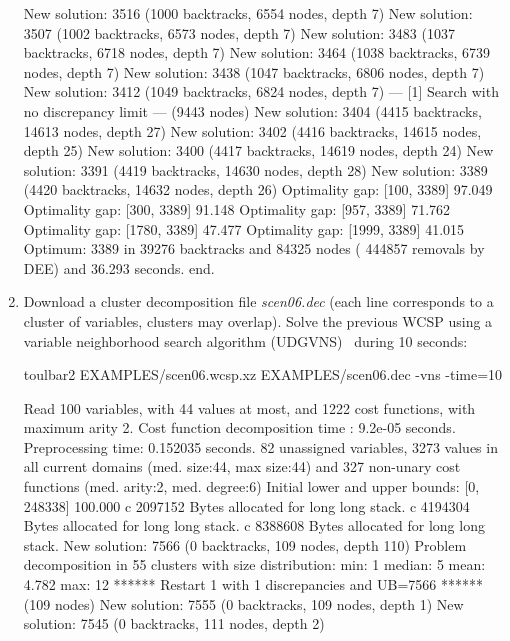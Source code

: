 \begin{enumerate}
{\begin{DoxyCode}
New solution: 3516 (1000 backtracks, 6554 nodes, depth 7)
New solution: 3507 (1002 backtracks, 6573 nodes, depth 7)
New solution: 3483 (1037 backtracks, 6718 nodes, depth 7)
New solution: 3464 (1038 backtracks, 6739 nodes, depth 7)
New solution: 3438 (1047 backtracks, 6806 nodes, depth 7)
New solution: 3412 (1049 backtracks, 6824 nodes, depth 7)
--- [1] Search with no discrepancy limit --- (9443 nodes)
New solution: 3404 (4415 backtracks, 14613 nodes, depth 27)
New solution: 3402 (4416 backtracks, 14615 nodes, depth 25)
New solution: 3400 (4417 backtracks, 14619 nodes, depth 24)
New solution: 3391 (4419 backtracks, 14630 nodes, depth 28)
New solution: 3389 (4420 backtracks, 14632 nodes, depth 26)
Optimality gap: [100, 3389] 97.049 %
Optimality gap: [300, 3389] 91.148 %
Optimality gap: [957, 3389] 71.762 %
Optimality gap: [1780, 3389] 47.477 %
Optimality gap: [1999, 3389] 41.015 %
Optimum: 3389 in 39276 backtracks and 84325 nodes ( 444857 removals by DEE) and 36.293 seconds.
end.
\end{DoxyCode}}
\item Download a cluster decomposition file {\em scen06.dec} (each line corresponds to a cluster of variables, clusters may overlap). Solve the previous WCSP using a variable neighborhood search algorithm (UDGVNS)~\cite{Ouali17} during 10 seconds:
\begin{DoxyCode}
	toulbar2 EXAMPLES/scen06.wcsp.xz EXAMPLES/scen06.dec -vns -time=10
\end{DoxyCode}
{\scriptsize
\begin{DoxyCode}
Read 100 variables, with 44 values at most, and 1222 cost functions, with maximum arity 2.
Cost function decomposition time : 9.2e-05 seconds.
Preprocessing time: 0.152035 seconds.
82 unassigned variables, 3273 values in all current domains (med. size:44, max size:44) and 327 non-unary cost functions (med. arity:2, med. degree:6)
Initial lower and upper bounds: [0, 248338] 100.000%
c 2097152 Bytes allocated for long long stack.
c 4194304 Bytes allocated for long long stack.
c 8388608 Bytes allocated for long long stack.
New solution: 7566 (0 backtracks, 109 nodes, depth 110)
Problem decomposition in 55 clusters with size distribution: min: 1 median: 5 mean: 4.782 max: 12
****** Restart 1 with 1 discrepancies and UB=7566 ****** (109 nodes)
New solution: 7555 (0 backtracks, 109 nodes, depth 1)
New solution: 7545 (0 backtracks, 111 nodes, depth 2)

\end{DoxyCode}}
\end{enumerate}
